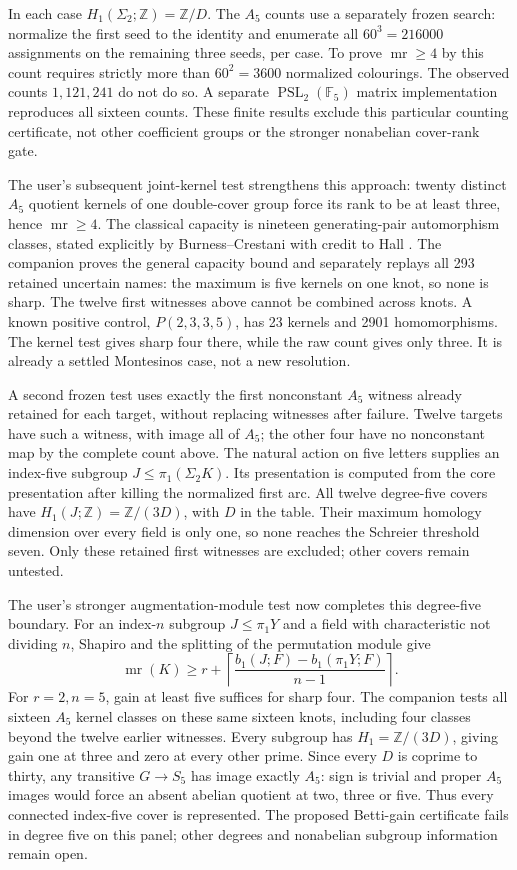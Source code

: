 \documentclass[11pt]{article}
\newcommand{\mr}{\operatorname{mr}}
\newcommand{\Z}{\mathbb Z}
\newcommand{\F}{\mathbb F}
\begin{document}
In each case $H_1(\Sigma_2;\Z)=\Z/D$. The $A_5$ counts use a separately
frozen search: normalize the first seed to the identity and enumerate
all $60^3=216000$ assignments on the remaining three seeds, per case.
To prove $\mr\ge4$ by this count requires strictly more than
$60^2=3600$ normalized colourings. The observed counts $1,121,241$
do not do so. A separate $\operatorname{PSL}_2(\F_5)$ matrix
implementation reproduces all sixteen counts. These finite results
exclude this particular counting certificate, not other coefficient
groups or the stronger nonabelian cover-rank gate.

The user's subsequent joint-kernel test strengthens this approach:
twenty distinct $A_5$ quotient kernels of one double-cover group
force its rank to be at least three, hence $\mr\ge4$. The classical
capacity is nineteen generating-pair automorphism classes, stated
explicitly by Burness--Crestani with credit to Hall \cite[p.~2]{bc}.
The companion  proves the
general capacity bound and separately replays all 293 retained
uncertain names: the maximum is five kernels on one knot, so none
is sharp. The twelve first witnesses above cannot be combined across
knots. A known positive control, $P(2,3,3,5)$, has 23 kernels and
2901 homomorphisms. The kernel test gives sharp four there, while
the raw count gives only three. It is already a settled Montesinos
case, not a new resolution.

A second frozen test uses exactly the first nonconstant $A_5$ witness
already retained for each target, without replacing witnesses after
failure. Twelve targets have such a witness, with image all of $A_5$;
the other four have no nonconstant map by the complete count above.
The natural action on five letters supplies an index-five subgroup
$J\le\pi_1(\Sigma_2K)$. Its presentation is computed from the core
presentation after killing the normalized first arc. All twelve
degree-five covers have $H_1(J;\Z)=\Z/(3D)$, with $D$ in the table.
Their maximum homology dimension over every field is only one,
so none reaches the Schreier threshold seven. Only these retained
first witnesses are excluded; other covers remain untested.

The user's stronger augmentation-module test now completes this
degree-five boundary. For an index-$n$ subgroup $J\le\pi_1Y$ and a
field with characteristic not dividing $n$, Shapiro and the splitting
of the permutation module give
\[
 \mr(K)\ge r+\left\lceil
 \frac{b_1(J;F)-b_1(\pi_1Y;F)}{n-1}\right\rceil.
\]
For $r=2,n=5$, gain at least five suffices for sharp four. The
companion  tests all sixteen
$A_5$ kernel classes on these same sixteen knots, including four
classes beyond the twelve earlier witnesses. Every subgroup has
$H_1=\Z/(3D)$, giving gain one at three and zero at every other
prime. Since every $D$ is coprime to thirty, any transitive
$G\to S_5$ has image exactly $A_5$: sign is trivial and proper
$A_5$ images would force an absent abelian quotient at two, three
or five. Thus every connected index-five cover is represented.
The proposed Betti-gain certificate fails in degree five on this
panel; other degrees and nonabelian subgroup information remain open.
\end{document}
